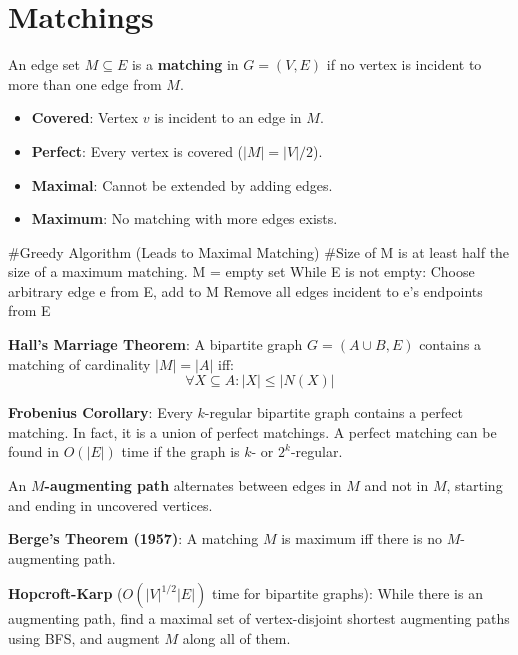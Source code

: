 \section{Matchings}

\begin{definition}
An edge set $M \subseteq E$ is a \textbf{matching} in $G = (V, E)$ if no vertex is incident to more than one edge from $M$.
\begin{itemize}
\item \textbf{Covered}: Vertex $v$ is incident to an edge in $M$.
\item \textbf{Perfect}: Every vertex is covered ($|M| = |V|/2$).
\item \textbf{Maximal}: Cannot be extended by adding edges.
\item \textbf{Maximum}: No matching with more edges exists.
\end{itemize}
\end{definition}

\begin{algorithm}
#Greedy Algorithm (Leads to Maximal Matching)
#Size of M is at least half the size of a maximum matching.
M = empty set
While E is not empty:
  Choose arbitrary edge e from E, add to M
  Remove all edges incident to e's endpoints from E
\end{algorithm}

\begin{theorem}
\textbf{Hall's Marriage Theorem}: A bipartite graph $G = (A \cup B, E)$ contains a matching of cardinality $|M|=|A|$ iff:
$$\forall X \subseteq A : |X| \le |N(X)|$$
\end{theorem}

\begin{theorem}
\textbf{Frobenius Corollary}: Every $k$-regular bipartite graph contains a perfect matching. In fact, it is a union of perfect matchings. A perfect matching can be found in $O(|E|)$ time if the graph is $k$- or $2^k$-regular.
\end{theorem}

\begin{definition}
An \textbf{$M$-augmenting path} alternates between edges in $M$ and not in $M$, starting and ending in uncovered vertices.
\end{definition}

\begin{theorem}
\textbf{Berge's Theorem (1957)}: A matching $M$ is maximum iff there is no $M$-augmenting path.
\end{theorem}

\begin{algorithm}
\textbf{Hopcroft-Karp} ($O(|V|^{1/2}|E|)$ time for bipartite graphs): While there is an augmenting path, find a maximal set of vertex-disjoint shortest augmenting paths using BFS, and augment $M$ along all of them.
\end{algorithm}
